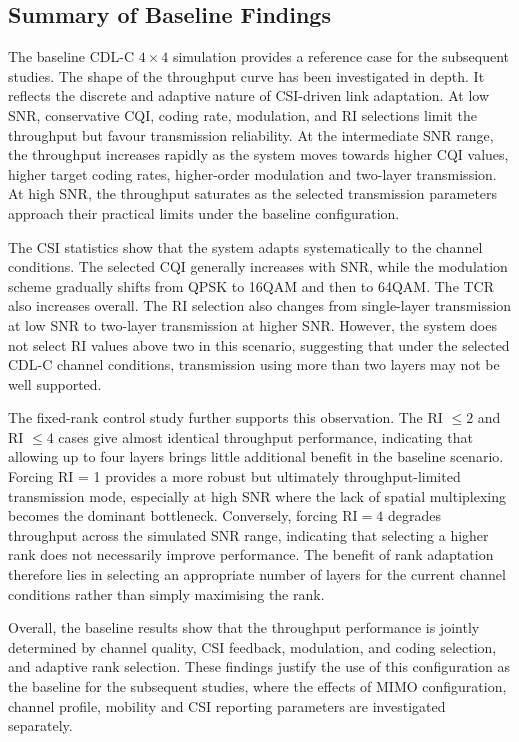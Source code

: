\documentclass[a4paper,12pt,onecolumn]{article}
\begin{document}
	
	\subsection{Summary of Baseline Findings}
	The baseline CDL-C $4\times4$ simulation provides a reference case for the subsequent studies. The shape of the throughput curve has been investigated in depth. It reflects the discrete and adaptive nature of CSI-driven link adaptation. At low SNR, conservative CQI, coding rate, modulation, and RI selections limit the throughput but favour transmission reliability. At the intermediate SNR range, the throughput increases rapidly as the system moves towards higher CQI values, higher target coding rates, higher-order modulation and two-layer transmission. At high SNR, the throughput saturates as the selected transmission parameters approach their practical limits under the baseline configuration.

	The CSI statistics show that the system adapts systematically to the channel conditions. The selected CQI generally increases with SNR, while the modulation scheme gradually shifts from QPSK to 16QAM and then to 64QAM. The TCR also increases overall. The RI selection also changes from single-layer transmission at low SNR to two-layer transmission at higher SNR. However, the system does not select RI values above two in this scenario, suggesting that under the selected CDL-C channel conditions, transmission using more than two layers may not be well supported.
		
	The fixed-rank control study further supports this observation. The RI $\leq 2$ and RI $\leq 4$ cases give almost identical throughput performance, indicating that allowing up to four layers brings little additional benefit in the baseline scenario. Forcing RI = 1 provides a more robust but ultimately throughput-limited transmission mode, especially at high SNR where the lack of spatial multiplexing becomes the dominant bottleneck. Conversely, forcing \(\mathrm{RI}=4\) degrades throughput across the simulated SNR range, indicating that selecting a higher rank does not necessarily improve performance. The benefit of rank adaptation therefore lies in selecting an appropriate number of layers for the current channel conditions rather than simply maximising the rank.
		
	Overall, the baseline results show that the throughput performance is jointly determined by channel quality, CSI feedback, modulation, and coding selection, and adaptive rank selection. These findings justify the use of this configuration as the baseline for the subsequent studies, where the effects of MIMO configuration, channel profile, mobility and CSI reporting parameters are investigated separately.
	
\end{document}
